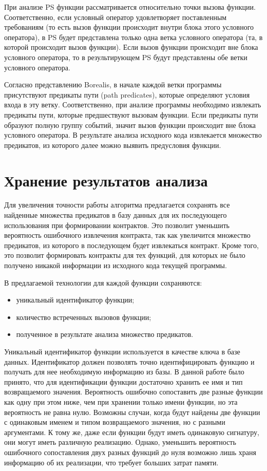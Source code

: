 При анализе PS функции рассматривается относительно точки вызова функции. Соответственно, если условный оператор удовлетворяет поставленным требованиям (то есть вызов функции происходит внутри блока этого условного оператора), в PS будет представлена только одна ветка условного оператора (та, в которой происходит вызов функции). Если вызов функции происходит вне блока условного оператора, то в результирующем PS будут представлены обе ветки условного оператора.

Согласно представлению Borealis, в начале каждой ветки программы присутствуют предикаты пути (path predicates), которые определяют условия входа в эту ветку. Соответственно, при анализе программы необходимо извлекать предикаты пути, которые предшествуют вызовам функции. Если предикаты пути образуют полную группу событий, значит вызов функции происходит вне блока условного оператора. В результате анализа исходного кода извлекается множество предикатов, из которого далее можно выявить предусловия функции.

\section{Хранение результатов анализа}
\label{section:saving}
Для увеличения точности работы алгоритма предлагается сохранять все найденные множества предикатов в базу данных для их последующего использования при формировании контрактов. Это позволит уменьшить вероятность ошибочного извлечения контракта, так как увеличится множество предикатов, из которого в последующем будет извлекаться контракт. Кроме того, это позволит формировать контракты для тех функций, для которых не было получено никакой информации из исходного кода текущей программы.

В предлагаемой технологии для каждой функции сохраняются:
\begin{itemize}
\item уникальный идентификатор функции;
\item количество встреченных вызовов функции;
\item полученное в результате анализа множество предикатов.
\end{itemize}

Уникальный идентификатор функции используется в качестве ключа в базе данных. Идентификатор должен позволять точно идентифицировать функцию и получать для нее необходимую информацию из базы. В данной работе было принято, что для идентификации функции достаточно хранить ее имя и тип возвращаемого значения. Вероятность ошибочно сопоставить две разные функции как одну при этом ниже, чем при хранении только имени функции, но эта вероятность не равна нулю. Возможны случаи, когда будут найдены две функции с одинаковым именем и типом возвращаемого значения, но с разными аргументами. К тому же, даже если функции будут иметь одинаковую сигнатуру, они могут иметь различную реализацию. Однако, уменьшить вероятность ошибочного сопоставления двух разных функций до нуля возможно лишь храня информацию об их реализации, что требует больших затрат памяти.

